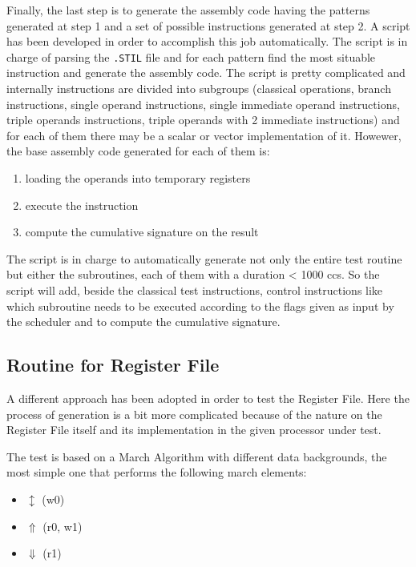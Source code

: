 \documentclass[paper=a4, fontsize=10pt]{scrartcl}	%
\begin{document}
	Finally, the last step is to generate the assembly code having the patterns generated at step 1 and a set of possible instructions generated at step 2. A script has been developed in order to accomplish this job automatically. The script is in charge of parsing the \texttt{.STIL} file and for each pattern find the most situable instruction and generate the assembly code. The script is pretty complicated and internally instructions are divided into subgroups (classical operations, branch instructions, single operand instructions, single immediate operand instructions, triple operands instructions, triple operands with 2 immediate instructions) and for each of them there may be a scalar or vector implementation of it. Howewer, the base assembly code generated for each of them is:
	\begin{enumerate}
		\itemsep0sp
		\item loading the operands into temporary registers
		\item execute the instruction
		\item compute the cumulative signature on the result
	\end{enumerate}

	The script is in charge to automatically generate not only the entire test routine but either the subroutines, each of them with a duration < 1000 ccs. So the script will add, beside the classical test instructions, control instructions like which subroutine needs to be executed according to the flags given as input by the scheduler and to compute the cumulative signature.

	\subsection{Routine for Register File}
	A different approach has been adopted in order to test the Register File. Here the process of generation is a bit more complicated because of the nature on the Register File itself and its implementation in the given processor under test.

	The test is based on a March Algorithm with different data backgrounds, the most simple one that performs the following march elements:

	\begin{itemize}
		\itemsep0sp
		\item $\updownarrow$ (w0)
		\item $\Uparrow$ (r0, w1)
		\item $\Downarrow$ (r1)
	\end{itemize}
\end{document}
